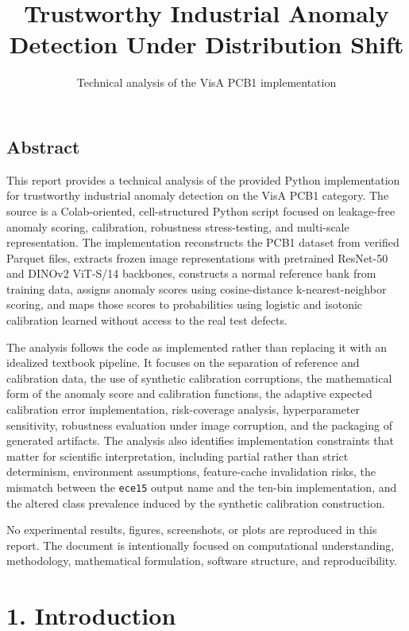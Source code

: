 \documentclass[
  11pt,
]{article}
\title{Trustworthy Industrial Anomaly Detection Under Distribution
Shift}
\subtitle{Technical analysis of the VisA PCB1 implementation}
\author{}
\date{}
\begin{document}
\maketitle

\subsection{Abstract}\label{abstract}

This report provides a technical analysis of the provided Python
implementation for trustworthy industrial anomaly detection on the VisA
PCB1 category. The source is a Colab-oriented, cell-structured Python
script focused on leakage-free anomaly scoring, calibration, robustness
stress-testing, and multi-scale representation. The implementation
reconstructs the PCB1 dataset from verified Parquet files, extracts frozen image representations with
pretrained ResNet-50 and DINOv2 ViT-S/14 backbones, constructs a normal
reference bank from training data, assigns anomaly scores using
cosine-distance k-nearest-neighbor scoring, and maps those scores to
probabilities using logistic and isotonic calibration learned without
access to the real test defects.

The analysis follows the code as implemented rather than replacing it
with an idealized textbook pipeline. It focuses on the separation of
reference and calibration data, the use of synthetic calibration
corruptions, the mathematical form of the anomaly score and calibration
functions, the adaptive expected calibration error implementation,
risk-coverage analysis, hyperparameter sensitivity, robustness evaluation
under image corruption, and the packaging of generated artifacts. The analysis also identifies implementation
constraints that matter for scientific interpretation, including partial
rather than strict determinism, environment assumptions, feature-cache
invalidation risks, the mismatch between the \texttt{ece15} output name
and the ten-bin implementation, and the altered class prevalence induced
by the synthetic calibration construction.

No experimental results, figures, screenshots, or plots are reproduced
in this report. The document is intentionally focused on computational
understanding, methodology, mathematical formulation, software
structure, and reproducibility.

\section{1. Introduction}\label{introduction}
\end{document}
